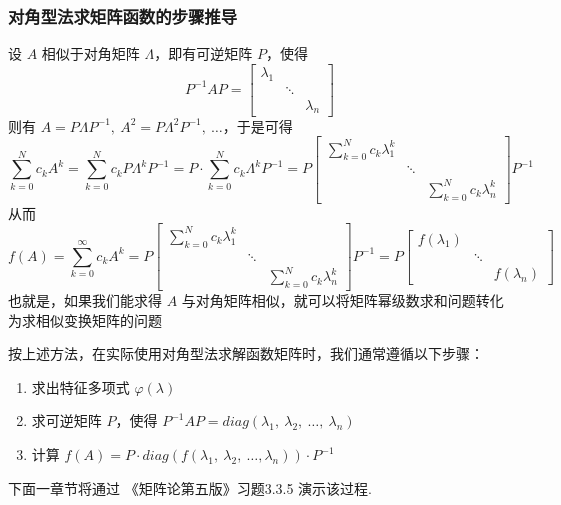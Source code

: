         \subsubsection{对角型法求矩阵函数的步骤推导}
            \par 设 $A$ 相似于对角矩阵 $\Lambda$，即有可逆矩阵 $P$，使得 
            \begin{equation*}
                P^{-1}AP = \begin{bmatrix}
                    \lambda_1 & & \\ & \ddots & \\ & & \lambda_n
                \end{bmatrix}
            \end{equation*}
            则有 $A = P\Lambda P^{-1}, \ A^2 = P\Lambda^2P^{-1}, \ \dots$，于是可得
            \begin{equation*}
                \sum_{k=0}^{N}c_kA^k = \sum_{k=0}^{N}c_kP\Lambda^kP^{-1} = P \cdot \sum_{k=0}^{N}c_k\Lambda^kP^{-1} = P \begin{bmatrix}
                    \sum_{k=0}^{N}c_k\lambda_1^k & & \\ & \ddots & \\ & & \sum_{k=0}^{N}c_k\lambda_n^k
                \end{bmatrix} P^{-1}
            \end{equation*}
            从而
            \begin{equation*}
                f(A) = \sum_{k=0}^{\infty}c_kA^k = P\begin{bmatrix}
                    \sum_{k=0}^{N}c_k\lambda_1^k & & \\ & \ddots & \\ & & \sum_{k=0}^{N}c_k\lambda_n^k
                \end{bmatrix} P^{-1} = P \begin{bmatrix}
                    f(\lambda_1) & & \\ & \ddots & \\ & & f(\lambda_n)
                \end{bmatrix}
            \end{equation*}
            也就是，如果我们能求得 $A$ 与对角矩阵相似，就可以将矩阵幂级数求和问题转化为求相似变换矩阵的问题
            \\
            \par 按上述方法，在实际使用对角型法求解函数矩阵时，我们通常遵循以下步骤：
            \begin{enumerate}
                \item 求出特征多项式 $\varphi(\lambda)$
                \item 求可逆矩阵 $P$，使得 $P^{-1}AP = diag(\lambda_1, \ \lambda_2, \ \dots, \ \lambda_n)$
                \item 计算 $f(A) = P \cdot diag(f(\lambda_1, \ \lambda_2, \ \dots, \lambda_n)) \cdot P^{-1}$
            \end{enumerate}
            \par 下面一章节将通过 《矩阵论第五版》习题3.3.5 演示该过程.

